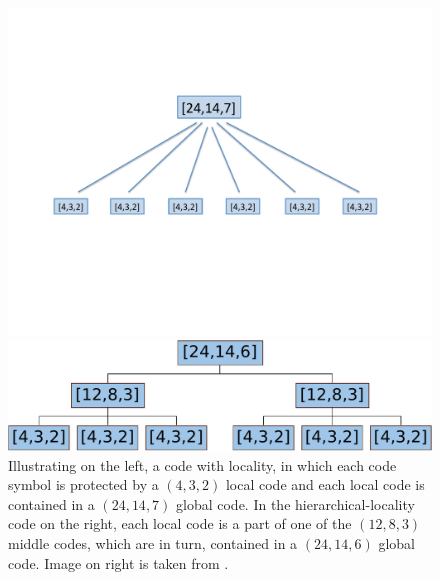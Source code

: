 \begin{figure}[H]
\centering
		\begin{minipage}[b]{0.45\textwidth}
			\includegraphics[scale=.42]{src/Figures/chap4/flat} 
		\end{minipage}
		\hspace*{0.55in}
		\begin{minipage}[b]{0.44\textwidth}
			\includegraphics[scale=.38]{src/Figures/chap4/hierarchical}  
		\end{minipage}
	\caption{Illustrating on the left, a code with locality, in which each code symbol is protected by a $(4,3,2)$ local code and each local code is contained in a $(24,14,7)$ global code. In the hierarchical-locality code on the right, each local code is a part of one of the $(12,8,3)$ middle codes, which are in turn, contained in a $(24,14,6)$ global code. Image on right is taken from \cite{SasAgaKum_loc}.} \label{fig:hierarchical} 
\end{figure}

